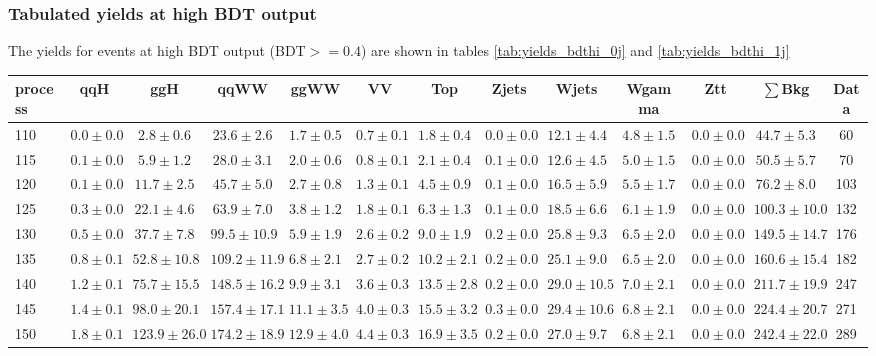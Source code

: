 %
%
%
\clearpage
\subsubsection{Tabulated yields at high BDT output}

The yields for events at high BDT output (BDT$>=0.4$) are shown
in tables \ref{tab:yields_bdthi_0j} and \ref{tab:yields_bdthi_1j}

\begin{table}
{%
 \tiny
 \begin{center}
 \begin{tabular}{l | c c | c c c c c c c c  | c c}
 \hline
 process & qqH & ggH & qqWW & ggWW & VV & Top & Zjets & Wjets & Wgamma & Ztt & $\sum$Bkg & Data \\
 \hline
110 & $0.0\pm0.0$ & $2.8\pm0.6$ & $23.6\pm2.6$ & $1.7\pm0.5$ & $0.7\pm0.1$ & $1.8\pm0.4$ & $0.0\pm0.0$ & $12.1\pm4.4$ & $4.8\pm1.5$ & $0.0\pm0.0$ & $44.7\pm5.3$ & 60 \\
115 & $0.1\pm0.0$ & $5.9\pm1.2$ & $28.0\pm3.1$ & $2.0\pm0.6$ & $0.8\pm0.1$ & $2.1\pm0.4$ & $0.1\pm0.0$ & $12.6\pm4.5$ & $5.0\pm1.5$ & $0.0\pm0.0$ & $50.5\pm5.7$ & 70 \\
120 & $0.1\pm0.0$ & $11.7\pm2.5$ & $45.7\pm5.0$ & $2.7\pm0.8$ & $1.3\pm0.1$ & $4.5\pm0.9$ & $0.1\pm0.0$ & $16.5\pm5.9$ & $5.5\pm1.7$ & $0.0\pm0.0$ & $76.2\pm8.0$ & 103 \\
125 & $0.3\pm0.0$ & $22.1\pm4.6$ & $63.9\pm7.0$ & $3.8\pm1.2$ & $1.8\pm0.1$ & $6.3\pm1.3$ & $0.1\pm0.0$ & $18.5\pm6.6$ & $6.1\pm1.9$ & $0.0\pm0.0$ & $100.3\pm10.0$ & 132 \\
130 & $0.5\pm0.0$ & $37.7\pm7.8$ & $99.5\pm10.9$ & $5.9\pm1.9$ & $2.6\pm0.2$ & $9.0\pm1.9$ & $0.2\pm0.0$ & $25.8\pm9.3$ & $6.5\pm2.0$ & $0.0\pm0.0$ & $149.5\pm14.7$ & 176 \\
135 & $0.8\pm0.1$ & $52.8\pm10.8$ & $109.2\pm11.9$ & $6.8\pm2.1$ & $2.7\pm0.2$ & $10.2\pm2.1$ & $0.2\pm0.0$ & $25.1\pm9.0$ & $6.5\pm2.0$ & $0.0\pm0.0$ & $160.6\pm15.4$ & 182 \\
140 & $1.2\pm0.1$ & $75.7\pm15.5$ & $148.5\pm16.2$ & $9.9\pm3.1$ & $3.6\pm0.3$ & $13.5\pm2.8$ & $0.2\pm0.0$ & $29.0\pm10.5$ & $7.0\pm2.1$ & $0.0\pm0.0$ & $211.7\pm19.9$ & 247 \\
145 & $1.4\pm0.1$ & $98.0\pm20.1$ & $157.4\pm17.1$ & $11.1\pm3.5$ & $4.0\pm0.3$ & $15.5\pm3.2$ & $0.3\pm0.0$ & $29.4\pm10.6$ & $6.8\pm2.1$ & $0.0\pm0.0$ & $224.4\pm20.7$ & 271 \\
150 & $1.8\pm0.1$ & $123.9\pm26.0$ & $174.2\pm18.9$ & $12.9\pm4.0$ & $4.4\pm0.3$ & $16.9\pm3.5$ & $0.2\pm0.0$ & $27.0\pm9.7$ & $6.8\pm2.1$ & $0.0\pm0.0$ & $242.4\pm22.0$ & 289 \\

\end{tabular}
\end{center}}
\end{table}

